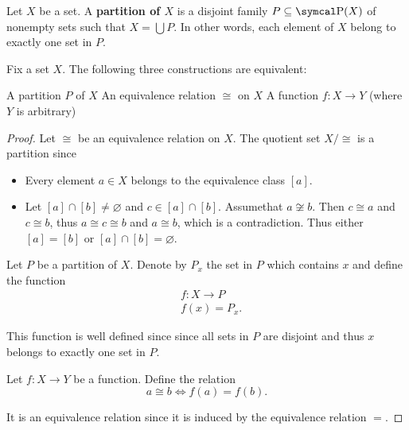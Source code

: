 \begin{definition}\label{def:set_partition}
  Let \( X \) be a set. A \textbf{partition of \( X \)} is a disjoint family \( P \subseteq \Power(X) \) of nonempty sets such that \( X = \bigcup P \). In other words, each element of \( X \) belong to exactly one set in \( P \).
\end{definition}

\begin{proposition}\label{thm:equivalence_partition}
  Fix a set \( X \). The following three constructions are equivalent:
  \begin{defenum}
     A partition \( P \) of \( X \)
     An equivalence relation \( \cong \) on \( X \)
     A function \( f: X \to Y \) (where \( Y \) is arbitrary)
  \end{defenum}
\end{proposition}
\begin{proof}
   Let \( \cong \) be an equivalence relation on \( X \). The quotient set \( X / \cong \) is a partition since
  \begin{itemize}
    \item Every element \( a \in X \) belongs to the equivalence class \( [a] \).
    \item Let \( [a] \cap [b] \neq \varnothing \) and \( c \in [a] \cap [b] \). Assume\LEM that \( a \not\cong b \). Then \( c \cong a \) and \( c \cong b \), thus \( a \cong c \cong b \) and \( a \cong b \), which is a contradiction. Thus either \( [a] = [b] \) or \( [a] \cap [b] = \varnothing \).
  \end{itemize}

   Let \( P \) be a partition of \( X \). Denote by \( P_x \) the set in \( P \) which contains \( x \) and define the function
  \begin{align*}
    &f: X \to P \\
    &f(x) = P_x.
  \end{align*}

  This function is well defined since since all sets in \( P \) are disjoint and thus \( x \) belongs to exactly one set in \( P \).

   Let \( f: X \to Y \) be a function. Define the relation
  \begin{equation*}
    a \cong b \iff f(a) = f(b).
  \end{equation*}

  It is an equivalence relation since it is induced by the equivalence relation \( = \).
\end{proof}

